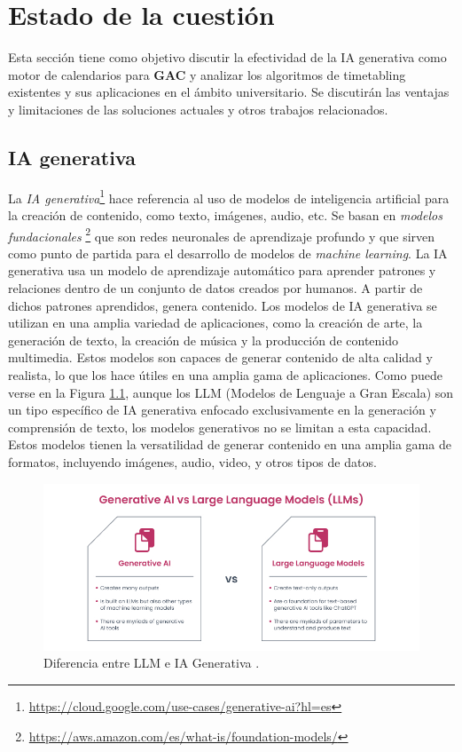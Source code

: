 \chapter{Estado de la cuestión}

Esta sección tiene como objetivo discutir la efectividad de la IA generativa como motor de calendarios para \textbf{GAC} y analizar los algoritmos de timetabling existentes y sus aplicaciones en el ámbito universitario. Se discutirán las ventajas y limitaciones de las soluciones actuales y otros trabajos relacionados.

\section{IA generativa}

La \textit{IA generativa}\footnote{\url{https://cloud.google.com/use-cases/generative-ai?hl=es}} hace referencia al uso de modelos de inteligencia artificial para la creación de contenido, como texto, imágenes, audio, etc. Se basan en \textit{modelos fundacionales} \footnote{\url{https://aws.amazon.com/es/what-is/foundation-models/}} que son redes neuronales de aprendizaje profundo y que sirven como punto de partida para el desarrollo de modelos de \textit{machine learning}. La IA generativa usa un modelo de aprendizaje automático para aprender patrones y relaciones dentro de un conjunto de datos creados por humanos. A partir de dichos patrones aprendidos, genera contenido. Los modelos de IA generativa se utilizan en una amplia variedad de aplicaciones, como la creación de arte, la generación de texto, la creación de música y la producción de contenido multimedia. Estos modelos son capaces de generar contenido de alta calidad y realista, lo que los hace útiles en una amplia gama de aplicaciones. Como puede verse en la Figura \ref{fig:llm_vs_generative}, aunque los LLM (Modelos de Lenguaje a Gran Escala) son un tipo específico de IA generativa enfocado exclusivamente en la generación y comprensión de texto, los modelos generativos no se limitan a esta capacidad. Estos modelos tienen la versatilidad de generar contenido en una amplia gama de formatos, incluyendo imágenes, audio, video, y otros tipos de datos.

\begin{figure}[H]
    \centering
    \includegraphics[width=1\textwidth]{./imagenes/large-language-models-vs-generative-ai-1.jpg}
    \caption{Diferencia entre LLM e IA Generativa \cite{chisw}.}
    \label{fig:llm_vs_generative}
\end{figure}


